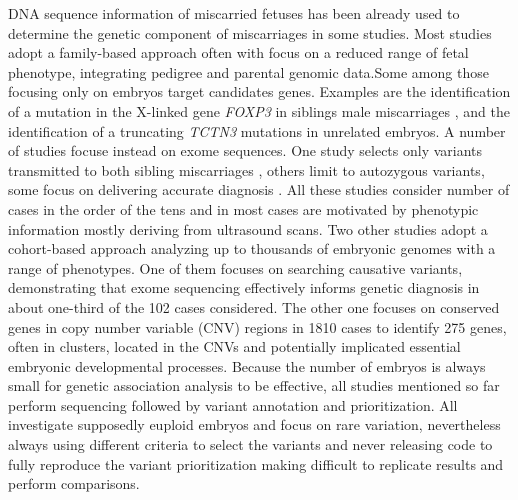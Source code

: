 DNA sequence information of miscarried fetuses has been already used to determine the genetic component of miscarriages in some studies\cite{rajcan2020next, filges2015exome}. Most studies adopt a family-based approach often with focus on a reduced range of fetal phenotype, integrating pedigree and parental genomic data\cite{bondeson2017nonsense, dohrn2015ecel1,wilbe2015musk, cristofoli2017novel}.Some among those focusing only on embryos target candidates genes. Examples are the identification of a mutation in the X-linked gene \textit{FOXP3} in siblings male miscarriages \cite{rae2015novel}, and the identification of a truncating \textit{TCTN3} mutations in unrelated embryos\cite{thomas2012tctn3}. A number of studies focuse instead on exome sequences\cite{shamseldin2015identification, qiao2016whole,fu2018whole, meier2019exome, yates2017whole}. One study selects only variants transmitted to both sibling miscarriages \cite{qiao2016whole}, others limit to autozygous variants\cite{thomas2012tctn3, shamseldin2015identification}, some focus on delivering accurate diagnosis \cite{meier2019exome}. All these studies consider number of cases in the order of the tens and in most cases are motivated by phenotypic information mostly deriving from ultrasound scans. 
Two other studies adopt a cohort-based approach analyzing up to thousands of embryonic genomes with a range of phenotypes\cite{chen2017characterization,zhao2020exome}. One of them focuses on  searching causative variants, demonstrating that exome sequencing effectively informs genetic diagnosis in about one-third of the 102 cases considered\cite{zhao2020exome}. The other one focuses on conserved genes in copy number variable (CNV) regions in 1810 cases to identify 275 genes, often in clusters, located in the CNVs and potentially implicated essential embryonic developmental processes\cite{chen2017characterization}.
Because the number of embryos is always small for genetic association analysis to be effective, all studies mentioned so far perform sequencing followed by variant annotation and prioritization. All investigate supposedly euploid embryos and focus on rare variation, nevertheless always using different criteria to select the variants and never releasing code to fully reproduce the variant prioritization making difficult to replicate results and perform comparisons.  


